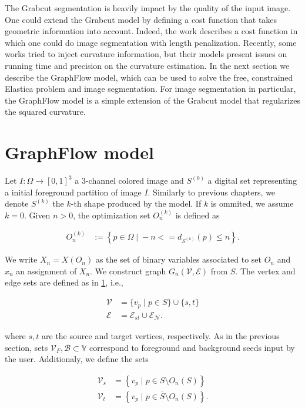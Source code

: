 The Grabcut segmentation is heavily impact by the quality of the input image. One could extend the Grabcut model by defining a cost function that takes geometric information into account. Indeed, the work \cite{} describes a cost function in which one could do image segmentation with length penalization. Recently, some works \cite{} tried to inject curvature information, but their models present issues on running time and precision on the curvature estimation. In the next section we describe the GraphFlow model, which can be used to solve the free, constrained Elastica problem and image segmentation. For image segmentation in particular, the GraphFlow model is a simple extension of the Grabcut model that regularizes the squared curvature.

\section{GraphFlow model}

Let $I:\Omega \rightarrow [0,1]^3$ a $3$-channel colored image and $S^{(0)}$ a digital set representing a initial foreground partition of image $I$.  Similarly to previous chapters, we denote $S^{(k)}$ the $k$-th shape produced by the model. If $k$ is ommited, we assume $k=0$. Given $n>0$, the optimization set $O_n^{(k)}$ is defined as

\begin{align*}
	O_n^{(k)} &:=\left\{ p \in \Omega \; | \; -n <= d_{S^{(k)}}(p) \leq n \right\}.
\end{align*}

We write $X_n = X(O_n)$ as the set of binary variables associated to set $O_n$ and $x_n$ an assignment of $X_n$. We construct graph $G_n( \mathcal{V},\mathcal{E})$ from $S$. The vertex and edge sets are defined as in \ref{}, i.e.,

\begin{align*}
	\mathcal{V} &= \{ v_p \; | \; p \in S \} \cup \{s,t\} \\
	\mathcal{E} &= \mathcal{E}_{st} \cup \mathcal{E}_\mathcal{N}.
\end{align*}

where $s,t$ are the source and target vertices, respectively. As in the previous section, sets $\mathcal{V}_F,\mathcal{B} \subset \mathbb{V}$ correspond to foreground and background seeds input by the user. Additionaly, we define the sets

\begin{align*}
	\mathcal{V}_s &= \left\{ v_p \; | \; p \in S \setminus O_n(S) \right\}\\
	\mathcal{V}_t &= \left\{ v_p \; | \; p \in \overline{S} \setminus O_n(S) \right\}.
\end{align*}

